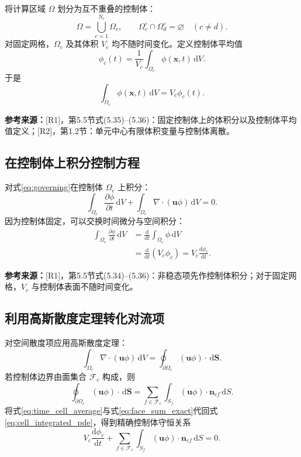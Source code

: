 \documentclass[UTF8,12pt,a4paper]{ctexart}
\numberwithin{equation}{section}
\newcommand{\Rone}{\textnormal{[R1]}}
\newcommand{\Rtwo}{\textnormal{[R2]}}
\newcommand{\source}[1]{%
  \par\smallskip
  \noindent\colorbox{sourcebg}{%
    \parbox{0.955\linewidth}{\footnotesize\color{sourcegray}\textbf{参考来源：}#1}%
  }
  \par\smallskip
}
\newcommand{\dd}{\,\mathrm d}
\begin{document}
将计算区域 $\Omega$ 划分为互不重叠的控制体：
\begin{equation}
  \Omega=\bigcup_{c=1}^{N_c}\Omega_c,
  \qquad
  \Omega_c^{\circ}\cap\Omega_d^{\circ}=\varnothing
  \quad(c\neq d).
  \label{eq:mesh_partition}
\end{equation}
对固定网格，$\Omega_c$ 及其体积 $V_c$ 均不随时间变化。定义控制体平均值
\begin{equation}
  \phi_c(t)
  =\frac{1}{V_c}\int_{\Omega_c}\phi(\bm x,t)\dd V.
  \label{eq:cell_average}
\end{equation}
于是
\begin{equation}
  \int_{\Omega_c}\phi(\bm x,t)\dd V=V_c\phi_c(t).
  \label{eq:cell_integral}
\end{equation}

\source{\Rone，第5.5节式(5.35)--(5.36)：固定控制体上的体积分以及控制体平均值定义；\Rtwo，第1.2节：单元中心有限体积变量与控制体离散。}

\subsection{在控制体上积分控制方程}

对式\eqref{eq:governing}在控制体 $\Omega_c$ 上积分：
\begin{equation}
  \int_{\Omega_c}\frac{\partial\phi}{\partial t}\dd V
  +\int_{\Omega_c}\nabla\cdot(\bm u\phi)\dd V=0.
  \label{eq:cell_integrated_pde}
\end{equation}
因为控制体固定，可以交换时间微分与空间积分：
\begin{align}
  \int_{\Omega_c}\frac{\partial\phi}{\partial t}\dd V
  &=\frac{\mathrm d}{\mathrm dt}\int_{\Omega_c}\phi\dd V
  \label{eq:time_exchange}\\
  &=\frac{\mathrm d}{\mathrm dt}(V_c\phi_c)
  =V_c\frac{\mathrm d\phi_c}{\mathrm dt}.
  \label{eq:time_cell_average}
\end{align}

\source{\Rone，第5.5节式(5.34)--(5.36)：非稳态项先作控制体积分；对于固定网格，$V_c$ 与控制体表面不随时间变化。}

\subsection{利用高斯散度定理转化对流项}

对空间散度项应用高斯散度定理：
\begin{equation}
  \int_{\Omega_c}\nabla\cdot(\bm u\phi)\dd V
  =\oint_{\partial\Omega_c}(\bm u\phi)\cdot\dd\bm S.
  \label{eq:gauss}
\end{equation}
若控制体边界由面集合 $\mathcal F_c$ 构成，则
\begin{equation}
  \oint_{\partial\Omega_c}(\bm u\phi)\cdot\dd\bm S
  =\sum_{f\in\mathcal F_c}
  \int_{S_f}(\bm u\phi)\cdot\bm n_{cf}\dd S.
  \label{eq:face_sum_exact}
\end{equation}
将式\eqref{eq:time_cell_average}与式\eqref{eq:face_sum_exact}代回式\eqref{eq:cell_integrated_pde}，得到精确控制体守恒关系
\begin{equation}
  V_c\frac{\mathrm d\phi_c}{\mathrm dt}
  +\sum_{f\in\mathcal F_c}
  \int_{S_f}(\bm u\phi)\cdot\bm n_{cf}\dd S=0.
  \label{eq:exact_balance}
\end{equation}
\end{document}
